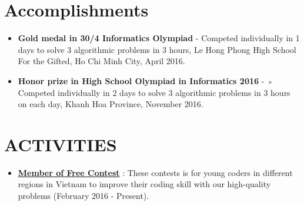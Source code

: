 \documentclass[letterpaper,11pt]{article}
\makeatletter
\newcommand{\resumeItem}[2]{
  \item\small{
    \textbf{#1}{ #2 \vspace{-2pt}}
  }
}
\newcommand{\resumeSubheading}[4]{
  \vspace{-1pt}\item
    \begin{tabular*}{0.97\textwidth}{l@{\extracolsep{\fill}}r}
      \textbf{#1} & #2 \\
      \textit{\small#3} & \textit{\small #4} \\
    \end{tabular*}\vspace{-5pt}
}
\newcommand{\resumeSubItem}[2]{\resumeItem{#1}{#2}\vspace{-4pt}}
\newcommand{\resumeSubHeadingListStart}{\begin{itemize}[leftmargin=*]}
\newcommand{\resumeSubHeadingListEnd}{\end{itemize}}
\makeatother
\begin{document}

\section{Accomplishments}
 \resumeSubHeadingListStart
 \resumeSubItem{}{
    \textbf{Gold medal in 30/4 Informatics Olympiad}{ - Competed individually in 1 days to solve 3 algorithmic problems in 3 hours}{, Le Hong Phong High School For the Gifted, Ho Chi Minh City, April 2016.}
    }
    \resumeSubItem{}{
    \textbf{Honor prize in High School Olympiad in Informatics 2016}{ - ◦ Competed individually in 2 days to solve 3 algorithmic problems in 3 hours on each day}{, Khanh Hoa Province, November 2016. }
    }
    
 \resumeSubHeadingListEnd
\section{ACTIVITIES}
  \resumeSubHeadingListStart
  \resumeSubItem{}{\href{https://bit.ly/354FYM9}{\textbf{Member of Free Contest}} :
  {These contests is for young coders in different regions in Vietnam to improve their coding skill with our high-quality problems} (February 2016 - Present).}
 
  \resumeSubHeadingListEnd
\end{document}
